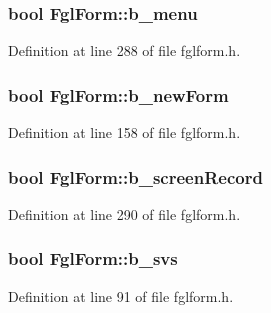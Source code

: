 \hypertarget{classFglForm_ac1f8bea18516701b1192825f83e962d7}{
\subsubsection[{b\_\-menu}]{\setlength{\rightskip}{0pt plus 5cm}bool {\bf FglForm::b\_\-menu}}}
\label{classFglForm_ac1f8bea18516701b1192825f83e962d7}


Definition at line 288 of file fglform.h.

\hypertarget{classFglForm_ab089d04abad8973c262e3c5e1827b070}{
\subsubsection[{b\_\-newForm}]{\setlength{\rightskip}{0pt plus 5cm}bool {\bf FglForm::b\_\-newForm}}}
\label{classFglForm_ab089d04abad8973c262e3c5e1827b070}


Definition at line 158 of file fglform.h.

\hypertarget{classFglForm_a656061ca98f40226c99fa61b12ced56c}{
\subsubsection[{b\_\-screenRecord}]{\setlength{\rightskip}{0pt plus 5cm}bool {\bf FglForm::b\_\-screenRecord}}}
\label{classFglForm_a656061ca98f40226c99fa61b12ced56c}


Definition at line 290 of file fglform.h.

\hypertarget{classFglForm_a8c411d93b67981a684a5cf6b67111dc1}{
\subsubsection[{b\_\-svs}]{\setlength{\rightskip}{0pt plus 5cm}bool {\bf FglForm::b\_\-svs}}}
\label{classFglForm_a8c411d93b67981a684a5cf6b67111dc1}


Definition at line 91 of file fglform.h.

